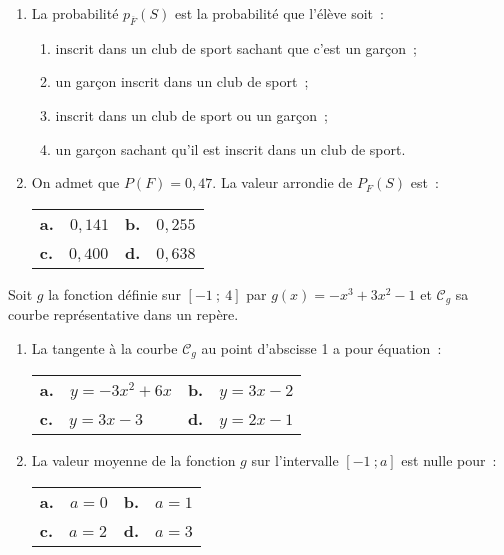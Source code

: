 \begin{enumerate}
     \item La probabilité $p_{\overline{F}}(S)$ est la probabilité que l'élève soit~:
     \begin{enumerate}[label=\alph*.]
          \item inscrit dans un club de sport sachant que c'est un garçon~;
          \item un garçon inscrit dans un club de sport~;
          \item inscrit dans un club de sport ou un garçon~;
          \item un garçon sachant qu'il est inscrit dans un club de sport.
     \end{enumerate}
     \item On admet que $P(F)=0,47$. La valeur arrondie de $P_{F}(S)$ est~:
     \begin{tabularx}{\linewidth}{XX}%
          \textbf{a.}~~$0,141$ & \textbf{b.}~~$0,255$ \\
          \textbf{c.}~~$0,400$ & \textbf{d.}~~$0,638$
     \end{tabularx}
     \medbreak
\end{enumerate}
Soit $g$ la fonction définie sur $[-1~;~4]$ par $g(x) = - x^3 + 3x^2 - 1$ et $\mathscr{C}_g$ sa courbe représentative dans un repère.
\begin{enumerate}
     \item La tangente à la courbe $\mathscr{C}_g$ au point d'abscisse 1 a pour équation~:
     \begin{center}
          \begin{tabularx}{\linewidth}{XX}%
               \textbf{a.}~~$y = - 3x^2 + 6x$ & \textbf{b.}~~$y= 3x-2$ \\
               \textbf{c.}~~$y= 3x - 3$ & \textbf{d.}~~$y = 2x - 1$
          \end{tabularx}
     \end{center}
     \item La valeur moyenne de la fonction $g$ sur l'intervalle $[-1~; a]$ est nulle pour~:
     \begin{center}
          \begin{tabularx}{\linewidth}{XX}%
               \textbf{a.}~~$a=0$ & \textbf{b.}~~$a=1$\\
               \textbf{c.}~~$a=2$ & \textbf{d.}~~$a=3$
          \end{tabularx}
     \end{center}
\end{enumerate}

